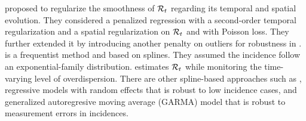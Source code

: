 \cite{abry2020spatial} proposed to regularize the smoothness of $\mathcal{R}_t$ regarding its temporal and spatial evolution. They considered a penalized regression with a second-order temporal regularization and a spatial regularization on $\mathcal{R}_t$ and with Poisson loss. They further extended it by introducing another penalty on outliers for robustness in \cite{pascal2022nonsmooth}.  
%
\cite{pircal2023spline} is a frequentist method and based on splines. They assumed the incidence follow an exponential-family distribution. %
\cite{ho2023accounting} estimates $\mathcal{R}_t$ while monitoring the time-varying level of overdispersion. 
%
There are other spline-based approaches such as \cite{azmon2014estimation,gressani2021approximate,pircalabelu2023spline}, regressive models with random effects \citep{jin2023epimix} that is robust to low incidence cases, and generalized autoregresive moving average (GARMA) model \citep{hettinger2023estimating} that is robust to measurement errors in incidences. 
%


